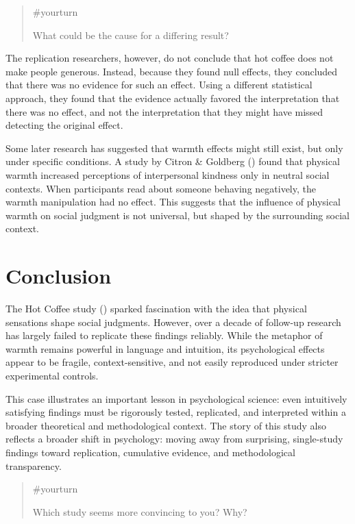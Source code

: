 \documentclass[
  letterpaper,
]{book}
\begin{document}
\begin{quote}
{\#yourturn}

What could be the cause for a differing result?
\end{quote}

The replication researchers, however, do not conclude that hot coffee
does not make people generous. Instead, because they found null effects,
they concluded that there was no evidence for such an effect. Using a
different statistical approach, they found that the evidence actually
favored the interpretation that there was no effect, and not the
interpretation that they might have missed detecting the original
effect.

Some later research has suggested that warmth effects might still exist,
but only under specific conditions. A study by Citron \& Goldberg
() found that physical warmth
increased perceptions of interpersonal kindness only in neutral social
contexts. When participants read about someone behaving negatively, the
warmth manipulation had no effect. This suggests that the influence of
physical warmth on social judgment is not universal, but shaped by the
surrounding social context.

\section{Conclusion}\label{conclusion-25}

The Hot Coffee study () sparked fascination with the idea that
physical sensations shape social judgments. However, over a decade of
follow-up research has largely failed to replicate these findings
reliably. While the metaphor of warmth remains powerful in language and
intuition, its psychological effects appear to be fragile,
context-sensitive, and not easily reproduced under stricter experimental
controls.

This case illustrates an important lesson in psychological science: even
intuitively satisfying findings must be rigorously tested, replicated,
and interpreted within a broader theoretical and methodological context.
The story of this study also reflects a broader shift in psychology:
moving away from surprising, single-study findings toward replication,
cumulative evidence, and methodological transparency.

\begin{quote}
{\#yourturn}

Which study seems more convincing to you? Why?
\end{quote}
\end{document}
